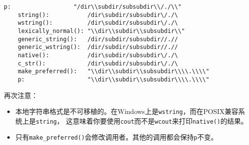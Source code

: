 \begin{lstlisting}[stringstyle=\color{black}, commentstyle=\color{black}]
    p:                  "/dir\\subdir/subsubdir\\/./\\"
    string():           /dir\subdir/subsubdir\/./\
    wstring():          /dir\subdir/subsubdir\/./\
    lexically_normal(): "\\dir\\subdir\\subsubdir\\"
    generic_string():   /dir/subdir/subsubdir//.//
    generic_wstring():  /dir/subdir/subsubdir//.//
    native():           /dir\subdir/subsubdir\/./\
    c_str():            /dir\subdir/subsubdir\/./\
    make_preferred():   "\\dir\\subdir\\subsubdir\\\\.\\\\"
    p:                  "\\dir\\subdir\\subsubdir\\\\.\\\\"
\end{lstlisting}
再次注意：
\begin{itemize}
    \item 本地字符串格式是不可移植的。在Windows上是\texttt{wstring}，而在POSIX兼容系统上是\texttt{string}，
    这意味着你要使用\texttt{cout}而不是\texttt{wcout}来打印\texttt{native()}的结果。
    \item 只有\texttt{make\_preferred()}会修改调用者。其他的调用都会保持\texttt{p}不变。
\end{itemize}

